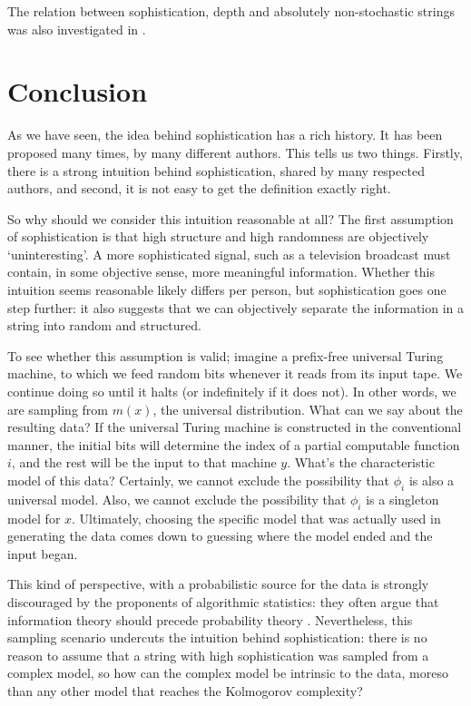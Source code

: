 \documentclass{style/llncs}
\begin{document}
The relation between sophistication, depth and absolutely non-stochastic strings was also investigated in \cite{antunes2013sophistication}.

\section{Conclusion}

As we have seen, the idea behind sophistication has a rich history. It has been proposed many times, by many different authors. This tells us two things. Firstly, there is a strong intuition behind sophistication, shared by many respected authors, and second, it is not easy to get the definition exactly right.

So why should we consider this intuition reasonable at all? The first assumption of sophistication is that high structure and high randomness are objectively `uninteresting'. A more sophisticated signal, such as a television broadcast must contain, in some objective sense, more meaningful information. Whether this intuition seems reasonable likely differs per person, but sophistication goes one step further: it also suggests that we can objectively separate the information in a string into random and structured.

To see whether this assumption is valid; imagine a prefix-free universal Turing machine, to which we feed random bits whenever it reads from its input tape. We continue doing so until it halts (or indefinitely if it does not). In other words, we are sampling from $m(x)$, the universal distribution. What can we say about the resulting data? If the universal Turing machine is constructed in the conventional manner, the initial bits will determine the index of a partial computable function $i$, and the rest will be the input to that machine $y$. What's the characteristic model of this data? Certainly, we cannot exclude the possibility that $\phi_i$ is also a universal model. Also, we cannot exclude the possibility that $\phi_i$ is a singleton model for $x$. Ultimately, choosing the specific model that was actually used in generating the data comes down to guessing where the model ended and the input began.

This kind of perspective, with a probabilistic source for the data is strongly discouraged by the proponents of algorithmic statistics: they often argue that information theory should precede probability theory \cite{kolmogorov1983combinatorial}. Nevertheless, this sampling scenario undercuts the intuition behind sophistication: there is no reason to assume that a string with high sophistication was sampled from a complex model, so how can the complex model be intrinsic to the data, moreso than any other model that reaches the Kolmogorov complexity?
\end{document}
